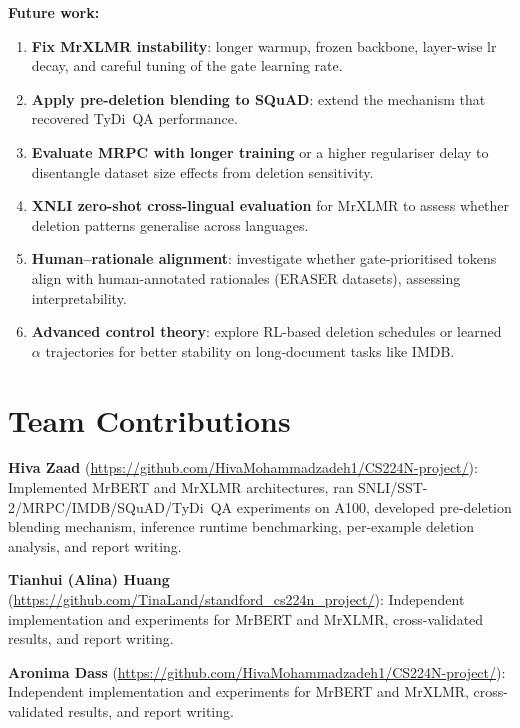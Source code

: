 \documentclass[11pt,a4paper]{article}
\begin{document}
\noindent \textbf{Future work:}
\begin{enumerate}[nosep]
    \item \textbf{Fix MrXLMR instability}: longer warmup, frozen backbone, layer-wise lr decay, and careful tuning of the gate learning rate.
    \item \textbf{Apply pre-deletion blending to SQuAD}: extend the mechanism that recovered TyDi~QA performance.
    \item \textbf{Evaluate MRPC with longer training} or a higher regulariser delay to disentangle dataset size effects from deletion sensitivity.
    \item \textbf{XNLI zero-shot cross-lingual evaluation} for MrXLMR to assess whether deletion patterns generalise across languages.
    \item \textbf{Human--rationale alignment}: investigate whether gate-prioritised tokens align with human-annotated rationales (ERASER datasets), assessing interpretability.
    \item \textbf{Advanced control theory}: explore RL-based deletion schedules or learned $\alpha$ trajectories for better stability on long-document tasks like IMDB.
\end{enumerate}


\section*{Team Contributions}

\textbf{Hiva Zaad} (\url{https://github.com/HivaMohammadzadeh1/CS224N-project/}): Implemented MrBERT and MrXLMR architectures, ran SNLI/SST-2/MRPC/IMDB/SQuAD/TyDi~QA experiments on A100, developed pre-deletion blending mechanism, inference runtime benchmarking, per-example deletion analysis, and report writing.

\noindent \textbf{Tianhui (Alina) Huang} (\url{https://github.com/TinaLand/standford_cs224n_project/}): Independent implementation and experiments for MrBERT and MrXLMR, cross-validated results, and report writing.

\noindent \textbf{Aronima Dass} (\url{https://github.com/HivaMohammadzadeh1/CS224N-project/}): Independent implementation and experiments for MrBERT and MrXLMR, cross-validated results, and report writing.
\end{document}
